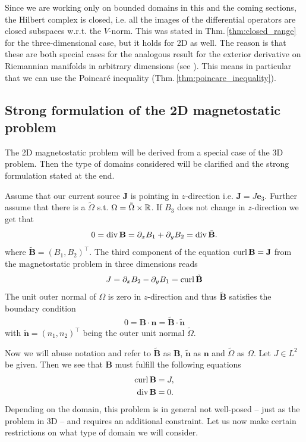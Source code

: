 \documentclass[../master_thesis.tex]{subfiles}
\begin{document}
\begin{remark}
    Since we are working only on bounded domains in this and the coming sections, 
    the Hilbert complex is closed, i.e. all the images of the differential operators 
    are closed subspaces w.r.t. the $V$-norm. This was stated in 
    Thm.\,\ref{thm:closed_range} for the three-dimensional case, but it holds 
    for 2D as well. The reason is that these are both special cases for the analogous result 
    for the exterior derivative on Riemannian manifolds 
    in arbitrary dimensions (see \cite[Sec.\,6.2.6]{arnold}). This means
    in particular that we can use the Poincaré inequality (Thm.\,\ref{thm:poincare_inequality}).
\end{remark}

\subsection{Strong formulation of the 2D magnetostatic problem}

The 2D magnetostatic problem will be derived from a special case of the 3D problem.
Then the type of domains considered will be clarified and the strong formulation 
stated at the end.

Assume that our current source 
$\mathbf{J}$ is pointing in $z$-direction i.e. $\mathbf{J} = J \mathbf{e}_3$. 
Further assume that there is a $\tilde{\Omega}$ s.t. 
$\Omega = \tilde{\Omega} \times \mathbb{R}$. If $B_3$ does not change in $z$-direction we get that 
\begin{align*}
    0 = \operatorname{div} \mathbf{B} = \partial_x B_1 + \partial_y B_2 = \operatorname{div} \tilde{\mathbf{B}}.
\end{align*}
where $\tilde{\mathbf{B}} = (B_1,B_2)^\top$. The third component of the equation
$\operatorname{curl} \mathbf{B} = \mathbf{J}$ from the magnetostatic problem in three dimensions reads 
\begin{align*}
    J = \partial_x B_2 - \partial_y B_1 = \operatorname{curl} \tilde{\mathbf{B}}
\end{align*}
The unit outer normal of $\Omega$ is zero in $z$-direction and thus $\tilde{\mathbf{B}}$ 
satisfies the boundary 
condition
\begin{align*}
    0 = \mathbf{B} \cdot \mathbf{n} = \tilde{\mathbf{B}} \cdot \tilde{\mathbf{n}}
\end{align*}
with $\tilde{\mathbf{n}} = (n_1, n_2)^\top$ being the outer unit normal 
$\tilde{\Omega}$. 

Now we will abuse notation and refer to $\tilde{\mathbf{B}}$ as $\mathbf{B}$, 
$\tilde{\mathbf{n}}$ as $\mathbf{n}$ and $\tilde{\Omega}$ as $\Omega$.
Let $J \in L^2$ be given. Then we see that $\mathbf{B}$ must fulfill the 
following equations
\begin{align*}
    \operatorname{curl} \mathbf{B} &= J,
    \\ \operatorname{div} \mathbf{B} &= 0.
\end{align*}
Depending on the domain, this problem is in general not well-posed -- just as the problem in 3D -- 
and requires an additional constraint. Let us now make certain restrictions 
on what type of domain we will consider. 
\end{document}

